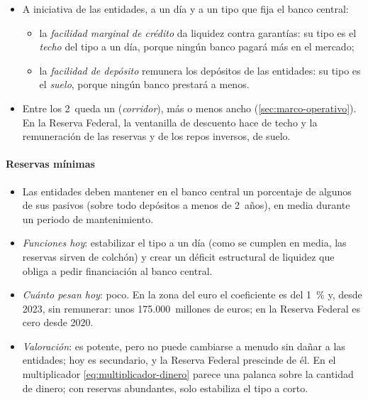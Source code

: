 \documentclass[11pt]{article}
\begin{document}
\begin{itemize}
\item A iniciativa de las entidades, a un día y a un tipo que fija el banco central:
  \begin{itemize}
  \item la \emph{facilidad marginal de crédito} da liquidez contra garantías: su tipo es el \emph{techo} del tipo a un día, porque ningún banco pagará más en el mercado;
  \item la \emph{facilidad de depósito} remunera los depósitos de las entidades: su tipo es el \emph{suelo}, porque ningún banco prestará a menos.
  \end{itemize}
\item Entre los 2~queda un  (\emph{corridor}), más o menos ancho (\ref{sec:marco-operativo})\nocite{BCE2026TiposOficiales}. En la Reserva Federal, la ventanilla de descuento hace de techo y la remuneración de las reservas y de los repos inversos, de suelo\nocite{Fed2019Amplias}.
\end{itemize}

\paragraph{Reservas mínimas}

\begin{itemize}
\item Las entidades deben mantener en el banco central un porcentaje de algunos de sus pasivos (sobre todo depósitos a menos de 2~años), en media durante un periodo de mantenimiento.
\item \emph{Funciones hoy}: estabilizar el tipo a un día (como se cumplen en media, las reservas sirven de colchón) y crear un déficit estructural de liquidez que obliga a pedir financiación al banco central.
\item \emph{Cuánto pesan hoy}: poco. En la zona del euro el coeficiente es del 1~\% y, desde 2023, sin remunerar\nocite{BCE2011Medidas,BCE2023Reservas}: unos 175.000~millones de euros\nocite{BCE2026ReservasMinimas}; en la Reserva Federal es cero desde 2020\nocite{Fed2020Reservas}.
\item \emph{Valoración}: es potente, pero no puede cambiarse a menudo sin dañar a las entidades; hoy es secundario, y la Reserva Federal prescinde de él\nocite{Fed2020Reservas}. En el multiplicador \eqref{eq:multiplicador-dinero} parece una palanca sobre la cantidad de dinero; con reservas abundantes, solo estabiliza el tipo a corto.
\end{itemize}
\end{document}
